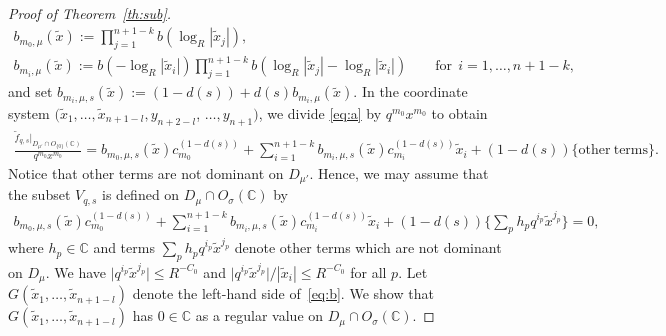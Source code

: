 \documentclass[pdftex]{sigma}
\numberwithin{equation}{section}
\begin{document}
\begin{proof}[Proof of Theorem~\ref{th:sub}]
\begin{gather*}
b_{m_0,\mu}(\tilde{x}) :=\prod_{j=1}^{n+1-k}b(\log_R|\tilde{x}_j|),\\
b_{m_i,\mu}(\tilde{x}) :=b(-\log_R|\tilde{x}_i|) \prod_{j=1}^{n+1-k}b(\log_R|\tilde{x}_j|-\log_R|\tilde{x}_i|)\qquad \mathrm{for} \ \ i=1, \dots, n+1-k,
\end{gather*}
and set $b_{m_i,\mu,s}(\tilde{x}) := (1-d(s))+d(s) b_{m_i,\mu}(\tilde{x})$.
In the coordinate system $(\tilde{x}_1, \dots, \tilde{x}_{n+1-l}, y_{n+2-l}$, $\dots, y_{n+1})$, we divide \eqref{eq:a} by $q^{m_0}x^{m_0}$ to obtain
\begin{gather*}%
\frac{\tilde{f}_{q,s} \big|_{D_{\mu'} \cap O_{\{0\}}({\mathbb C})} }{q^{m_0}x^{m_0}}=
b_{m_0,\mu,s}(\tilde{x})c_{m_0}^{(1-d(s))}\!+\!\sum_{i=1}^{n+1-k} \!\!b_{m_i,\mu,s}(\tilde{x})c_{m_i}^{(1-d(s))}\tilde{x}_i
+(1-d(s))\{ \mathrm{other\ terms} \}.
\end{gather*}
Notice that other terms are not dominant on $D_{\mu'}$. Hence, we may assume that the subset $V_{q,s}$ is def\/ined on $D_\mu \cap O_\sigma({\mathbb C})$ by
\begin{gather}\label{eq:b}
b_{m_0,\mu,s}(\tilde{x})c_{m_0}^{(1-d(s))}+\sum_{i=1}^{n+1-k} b_{m_i,\mu,s}(\tilde{x})c_{m_i}^{(1-d(s))}\tilde{x}_i
+(1-d(s))\bigg\{ \sum_{p} h_p q^{i_p}\tilde{x}^{j_p} \bigg\}=0,
\end{gather}
where $h_p \in {\mathbb C}$ and terms $\sum_{p} h_p q^{i_p}\tilde{x}^{j_p}$ denote other terms which are not dominant on $D_\mu$. We have $\big|q^{i_p}\tilde{x}^{j_p}\big| \leq R^{-C_0}$ and $\big|q^{i_p}\tilde{x}^{j_p}\big|/|\tilde{x}_{i}| \leq R^{-C_0}$ for all $p$. Let $G(\tilde{x}_1, \dots, \tilde{x}_{n+1-l})$ denote the left-hand side of~\eqref{eq:b}. We show that $G(\tilde{x}_1, \dots, \tilde{x}_{n+1-l})$ has $0 \in {\mathbb C}$ as a regular value on $D_\mu \cap O_\sigma({\mathbb C})$.


\end{proof}
\end{document}
